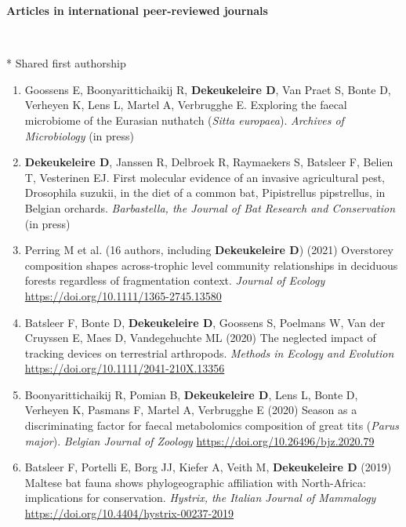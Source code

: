 \documentclass[10pt, twoside]{book} %
\begin{document}
\begin{large}\textbf{Articles in international peer-reviewed journals}\end{large}\\
\begin{footnotesize}* Shared first authorship \end{footnotesize}

	\begin{enumerate}
		\item Goossens E, Boonyarittichaikij R, \textbf{Dekeukeleire D}, Van Praet S, Bonte D, Verheyen K, Lens L, Martel A, Verbrugghe E. Exploring the faecal microbiome of the Eurasian nuthatch (\textit{Sitta europaea}). \textit{Archives of Microbiology} (in press)
		
		\item \textbf{Dekeukeleire D}, Janssen R, Delbroek R, Raymaekers S, Batsleer F, Belien T, Vesterinen EJ. First molecular evidence of an invasive agricultural pest, Drosophila suzukii, in the diet of a common bat, Pipistrellus pipstrellus, in Belgian orchards. \textit{Barbastella, the Journal of Bat Research and Conservation} (in press)
		
		\item Perring M et al. (16 authors, including \textbf{Dekeukeleire D}) (2021) Overstorey composition shapes across-trophic level community relationships in deciduous forests regardless of fragmentation context. \textit{Journal of Ecology} \url{https://doi.org/10.1111/1365-2745.13580}
		
		\item Batsleer F, Bonte D, \textbf{Dekeukeleire D}, Goossens S, Poelmans W, Van der Cruyssen E, Maes D, Vandegehuchte ML (2020) The neglected impact of tracking devices on terrestrial arthropods. \textit{Methods in Ecology and Evolution} \url{https://doi.org/10.1111/2041-210X.13356}
		
		\item Boonyarittichaikij R, Pomian B, \textbf{Dekeukeleire D}, Lens L, Bonte D, Verheyen K, Pasmans F, Martel A, Verbrugghe E (2020) Season as a discriminating factor for faecal metabolomics composition of great tits (\textit{Parus major}). \textit{Belgian Journal of Zoology} \url{https://doi.org/10.26496/bjz.2020.79}
		
		\item Batsleer F, Portelli E, Borg JJ, Kiefer A, Veith M, \textbf{Dekeukeleire D} (2019) Maltese bat fauna shows phylogeographic affiliation with North-Africa: implications for conservation. \textit{Hystrix, the Italian Journal of Mammalogy} \url{https://doi.org/10.4404/hystrix-00237-2019}
		

\end{enumerate}
\end{document}

